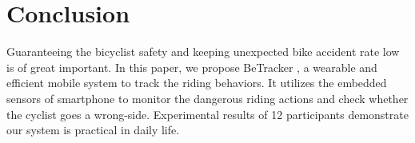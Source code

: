 \documentclass{sigchi-ext}
\def\sysname{BeTracker }
\begin{document}
\section{Conclusion}
Guaranteeing the bicyclist safety and keeping unexpected bike accident rate low is of great important. In this paper, we propose \sysname, a wearable and efficient mobile system to track the riding behaviors. It utilizes the embedded sensors of smartphone to monitor the dangerous riding actions and check whether the cyclist goes a wrong-side. Experimental results of 12 participants demonstrate our system is practical in daily life. 


\end{document}
